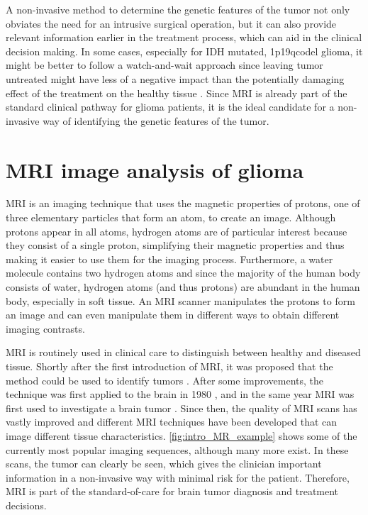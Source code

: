 A non-invasive method to determine the genetic features of the \gls{tumor} not only obviates the need for an intrusive surgical operation, but it can also provide relevant information earlier in the treatment process, which can aid in the clinical decision making.
In some cases, especially for \gls{IDH} mutated, \acl{1p19qcodel} \gls{glioma}, it might be better to follow a watch-and-wait approach since leaving \gls{tumor} untreated might have less of a negative impact than the potentially damaging effect of the treatment on the healthy tissue \autocite{vandenbent2012lggtreatment, welle2017EANO}.
Since \gls{MRI} is already part of the standard clinical pathway for glioma patients, it is the ideal candidate for a non-invasive way of identifying the genetic features of the \gls{tumor}.

\section{MRI image analysis of glioma}

\gls{MRI} is an imaging technique that uses the magnetic properties of protons, one of three elementary particles that form an atom, to create an image.
Although protons appear in all atoms, hydrogen atoms are of particular interest because they consist of a single proton, simplifying their magnetic properties and thus making it easier to use them for the imaging process.
Furthermore, a water molecule contains two hydrogen atoms and since the majority of the human body consists of water, hydrogen atoms (and thus protons) are abundant in the human body, especially in soft tissue.
An \gls{MRI} scanner manipulates the protons to form an image and can even manipulate them in different ways to obtain different imaging contrasts.

\gls{MRI} is routinely used in clinical care to distinguish between healthy and diseased tissue.
Shortly after the first introduction of \gls{MRI}, it was proposed that the method could be used to identify \glspl{tumor} \autocite{damadian1971tumor}.
After some improvements, the technique was first applied to the brain in 1980 \autocite{holland1980brain}, and in the same year MRI was first used to investigate a brain \gls{tumor} \autocite{hawkes1980NMRbrain}.
Since then, the quality of \gls{MRI} scans has vastly improved and different \gls{MRI} techniques have been developed that can image different tissue characteristics.
\cref{fig:intro_MR_example} shows some of the currently most popular imaging sequences, although many more exist.
In these scans, the \gls{tumor} can clearly be seen, which gives the clinician important information in a non-invasive way with minimal risk for the patient.
Therefore, \gls{MRI} is part of the standard-of-care for brain \gls{tumor} diagnosis and treatment decisions.

